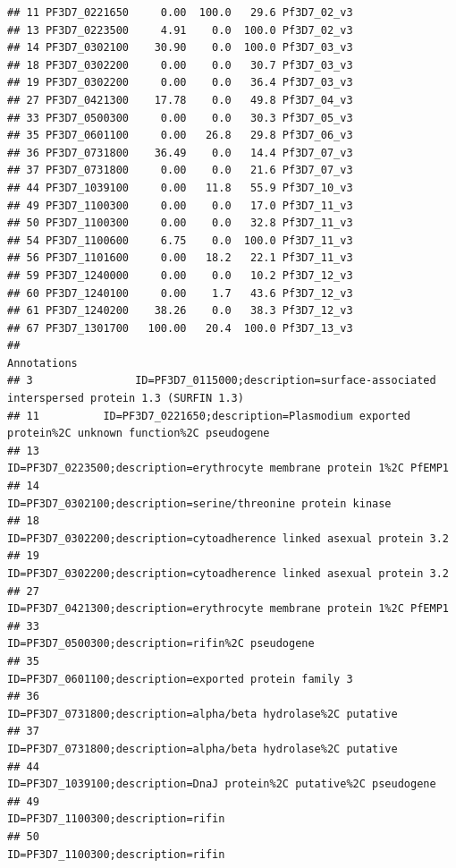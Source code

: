 \documentclass[12pt, a4paper]{article}\usepackage[]{graphicx}\usepackage[]{color}
\makeatletter
\newenvironment{kframe}{%
 \def\at@end@of@kframe{}%
 \ifinner\ifhmode%
  \def\at@end@of@kframe{\end{minipage}}%
  \begin{minipage}{\columnwidth}%
 \fi\fi%
 \def\FrameCommand##1{\hskip\@totalleftmargin \hskip-\fboxsep
 \colorbox{shadecolor}{##1}\hskip-\fboxsep
     \hskip-\linewidth \hskip-\@totalleftmargin \hskip\columnwidth}%
 \MakeFramed {\advance\hsize-\width
   \@totalleftmargin\z@ \linewidth\hsize
   \@setminipage}}%
 {\par\unskip\endMakeFramed%
 \at@end@of@kframe}
\newenvironment{knitrout}{}{} %
\makeatother
\begin{document}
\begin{knitrout}
\begin{kframe}
\begin{verbatim}
## 11 PF3D7_0221650     0.00  100.0   29.6 Pf3D7_02_v3
## 13 PF3D7_0223500     4.91    0.0  100.0 Pf3D7_02_v3
## 14 PF3D7_0302100    30.90    0.0  100.0 Pf3D7_03_v3
## 18 PF3D7_0302200     0.00    0.0   30.7 Pf3D7_03_v3
## 19 PF3D7_0302200     0.00    0.0   36.4 Pf3D7_03_v3
## 27 PF3D7_0421300    17.78    0.0   49.8 Pf3D7_04_v3
## 33 PF3D7_0500300     0.00    0.0   30.3 Pf3D7_05_v3
## 35 PF3D7_0601100     0.00   26.8   29.8 Pf3D7_06_v3
## 36 PF3D7_0731800    36.49    0.0   14.4 Pf3D7_07_v3
## 37 PF3D7_0731800     0.00    0.0   21.6 Pf3D7_07_v3
## 44 PF3D7_1039100     0.00   11.8   55.9 Pf3D7_10_v3
## 49 PF3D7_1100300     0.00    0.0   17.0 Pf3D7_11_v3
## 50 PF3D7_1100300     0.00    0.0   32.8 Pf3D7_11_v3
## 54 PF3D7_1100600     6.75    0.0  100.0 Pf3D7_11_v3
## 56 PF3D7_1101600     0.00   18.2   22.1 Pf3D7_11_v3
## 59 PF3D7_1240000     0.00    0.0   10.2 Pf3D7_12_v3
## 60 PF3D7_1240100     0.00    1.7   43.6 Pf3D7_12_v3
## 61 PF3D7_1240200    38.26    0.0   38.3 Pf3D7_12_v3
## 67 PF3D7_1301700   100.00   20.4  100.0 Pf3D7_13_v3
##                                                                                            Annotations
## 3                ID=PF3D7_0115000;description=surface-associated interspersed protein 1.3 (SURFIN 1.3)
## 11          ID=PF3D7_0221650;description=Plasmodium exported protein%2C unknown function%2C pseudogene
## 13                               ID=PF3D7_0223500;description=erythrocyte membrane protein 1%2C PfEMP1
## 14                                        ID=PF3D7_0302100;description=serine/threonine protein kinase
## 18                               ID=PF3D7_0302200;description=cytoadherence linked asexual protein 3.2
## 19                               ID=PF3D7_0302200;description=cytoadherence linked asexual protein 3.2
## 27                               ID=PF3D7_0421300;description=erythrocyte membrane protein 1%2C PfEMP1
## 33                                                    ID=PF3D7_0500300;description=rifin%2C pseudogene
## 35                                              ID=PF3D7_0601100;description=exported protein family 3
## 36                                       ID=PF3D7_0731800;description=alpha/beta hydrolase%2C putative
## 37                                       ID=PF3D7_0731800;description=alpha/beta hydrolase%2C putative
## 44                                 ID=PF3D7_1039100;description=DnaJ protein%2C putative%2C pseudogene
## 49                                                                  ID=PF3D7_1100300;description=rifin
## 50                                                                  ID=PF3D7_1100300;description=rifin

\end{verbatim}
\end{kframe}
\end{knitrout}
\end{document}
